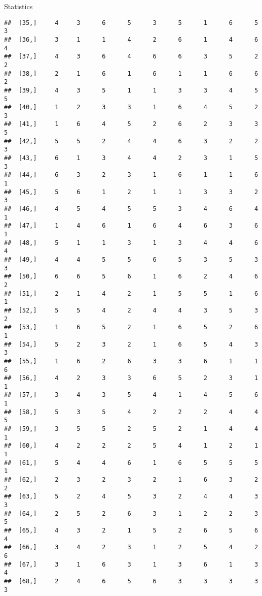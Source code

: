 \documentclass[
  ignorenonframetext,
]{beamer}
\begin{document}
\begin{frame}[fragile]{Statistics}
\begin{verbatim}
##  [35,]     4     3      6      5      3      5      1      6      5      3
##  [36,]     3     1      1      4      2      6      1      4      6      4
##  [37,]     4     3      6      4      6      6      3      5      2      2
##  [38,]     2     1      6      1      6      1      1      6      6      2
##  [39,]     4     3      5      1      1      3      3      4      5      5
##  [40,]     1     2      3      3      1      6      4      5      2      3
##  [41,]     1     6      4      5      2      6      2      3      3      5
##  [42,]     5     5      2      4      4      6      3      2      2      3
##  [43,]     6     1      3      4      4      2      3      1      5      3
##  [44,]     6     3      2      3      1      6      1      1      6      1
##  [45,]     5     6      1      2      1      1      3      3      2      3
##  [46,]     4     5      4      5      5      3      4      6      4      1
##  [47,]     1     4      6      1      6      4      6      3      6      1
##  [48,]     5     1      1      3      1      3      4      4      6      4
##  [49,]     4     4      5      5      6      5      3      5      3      3
##  [50,]     6     6      5      6      1      6      2      4      6      2
##  [51,]     2     1      4      2      1      5      5      1      6      1
##  [52,]     5     5      4      2      4      4      3      5      3      2
##  [53,]     1     6      5      2      1      6      5      2      6      1
##  [54,]     5     2      3      2      1      6      5      4      3      3
##  [55,]     1     6      2      6      3      3      6      1      1      6
##  [56,]     4     2      3      3      6      5      2      3      1      1
##  [57,]     3     4      3      5      4      1      4      5      6      1
##  [58,]     5     3      5      4      2      2      2      4      4      5
##  [59,]     3     5      5      2      5      2      1      4      4      1
##  [60,]     4     2      2      2      5      4      1      2      1      1
##  [61,]     5     4      4      6      1      6      5      5      5      1
##  [62,]     2     3      2      3      2      1      6      3      2      2
##  [63,]     5     2      4      5      3      2      4      4      3      3
##  [64,]     2     5      2      6      3      1      2      2      3      5
##  [65,]     4     3      2      1      5      2      6      5      6      4
##  [66,]     3     4      2      3      1      2      5      4      2      6
##  [67,]     3     1      6      3      1      3      6      1      3      4
##  [68,]     2     4      6      5      6      3      3      3      3      3

\end{verbatim}
\end{frame}
\end{document}
